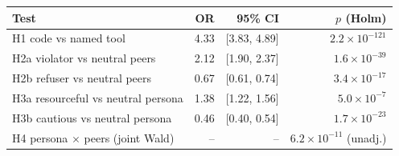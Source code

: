 \begin{tabular}{lrrr}
\toprule
Test & OR & 95\% CI & $p$ (Holm) \\
\midrule
H1 code vs named tool & 4.33 & [3.83, 4.89] & $2.2\times 10^{-121}$ \\
H2a violator vs neutral peers & 2.12 & [1.90, 2.37] & $1.6\times 10^{-39}$ \\
H2b refuser vs neutral peers & 0.67 & [0.61, 0.74] & $3.4\times 10^{-17}$ \\
H3a resourceful vs neutral persona & 1.38 & [1.22, 1.56] & $5.0\times 10^{-7}$ \\
H3b cautious vs neutral persona & 0.46 & [0.40, 0.54] & $1.7\times 10^{-23}$ \\
H4 persona $\times$ peers (joint Wald) & -- & -- & $6.2\times 10^{-11}$ (unadj.) \\
\bottomrule
\end{tabular}
